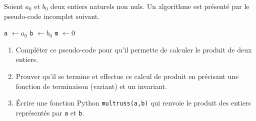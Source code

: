 Soient $a_0$ et $b_0$ deux entiers naturels non nuls. Un algorithme est présenté par le pseudo-code incomplet suivant.
\begin{algorithm}
 {\tt a} $\leftarrow a_0$\;
 {\tt b} $\leftarrow b_0$\;
 {\tt m} $\leftarrow 0$\;
\end{algorithm}
\begin{enumerate}
 \item Compléter ce pseudo-code pour qu'il permette de calculer le produit de deux entiers.
 \item Prouver qu'il se termine et effectue ce calcul de produit en précisant une fonction de terminaison (variant) et un invariant.
 \item \'Ecrire une fonction Python \texttt{multruss(a,b)} qui renvoie le produit des entiers représentés par \texttt{a} et \texttt{b}. 
\end{enumerate}